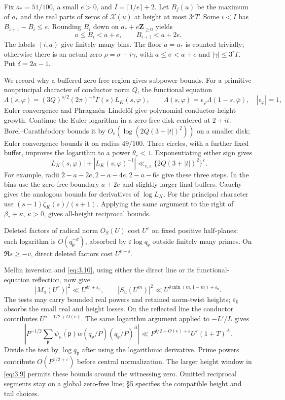 \documentclass[11pt,a4paper]{article}
\begin{document}
Fix \(a_*=51/100\), a small \(e>0\), and \(I=\lceil1/e\rceil+2\). Let \(B_j(u)\) be the maximum of \(a_*\) and the real parts of zeros of \(\mathcal X(u)\) at height at most \(3^jT\). Some \(i<I\) has \(B_{i+1}-B_i\le e\). Rounding \(B_i\) down on \(a_*+e\mathbf Z_{\ge0}\) yields \[
 a\le B_i<a+e,\qquad B_{i+1}<a+2e.
\tag{3.9}\label{eq:3.9}
\] The labels \((i,a)\) give finitely many bins. The floor \(a=a_*\) is counted trivially; otherwise there is an actual zero \(\rho=\sigma+i\gamma\), with \(a\le\sigma<a+e\) and \(|\gamma|\le3^iT\). Put \(\delta=2a-1\).

We record why a buffered zero-free region gives subpower bounds. For a primitive nonprincipal character of conductor norm \(Q\), the functional equation \[
 \Lambda(s,\varphi)=(3Q)^{s/2}(2\pi)^{-s}\Gamma(s)L_K(s,\varphi),\qquad
 \Lambda(s,\varphi)=\epsilon_\varphi\Lambda(1-s,\bar\varphi),\quad|\epsilon_\varphi|=1,
\] Euler convergence and Phragmén--Lindelöf give polynomial conductor-height growth. Continue the Euler logarithm in a zero-free disk centered at \(2+it\). Borel--Carathéodory bounds it by \(O_e(\log(2Q(3+|t|)^2))\) on a smaller disk; Euler convergence bounds it on radius \(49/100\). Three circles, with a further fixed buffer, improves the logarithm to a power \(\theta_e<1\). Exponentiating either sign gives \[
 |L_K(s,\varphi)|+|L_K(s,\varphi)^{-1}|
 \ll_{e,\varepsilon}\{2Q(3+|t|)^2\}^{\varepsilon}.
\tag{3.10}\label{eq:3.10}
\] For example, radii \(2-a-2e,2-a-4e,2-a-6e\) give these three steps. In the bins use the zero-free boundary \(a+2e\) and slightly larger final buffers. Cauchy gives the analogous bounds for derivatives of \(\log L_K\). For the principal character use \((s-1)\zeta_K(s)/(s+1)\). Applying the same argument to the right of \(\beta_*+\kappa\), \(\kappa>0\), gives all-height reciprocal bounds.

Deleted factors of radical norm \(O_S(U)\) cost \(U^\varepsilon\) on fixed positive half-planes: each logarithm is \(O(q_{\mathfrak p}^{-\sigma})\), absorbed by \(\varepsilon\log q_{\mathfrak p}\) outside finitely many primes. On \(\Re s\ge-v\), direct deleted factors cost \(U^{v+\varepsilon}\).

Mellin inversion and \eqref{eq:3.10}, using either the direct line or its functional-equation reflection, now give \[
 |M_u(U^r)|^2\ll U^{\delta r+\varepsilon_0},\qquad
 |S_u(U^m)|^2\ll U^{\delta\min(m,1-m)+\varepsilon_0}.
\tag{3.11}\label{eq:3.11}
\] The tests may carry bounded real powers and retained norm-twist heights; \(\varepsilon_0\) absorbs the small real and height losses. On the reflected line the conductor contributes \(U^{a-1/2+O(e)}\). The same logarithm argument applied to \(-L'/L\) gives \[
 \left|P^{-1/2}\sum_{\mathfrak p}\overline{\psi_u(\mathfrak p)}
 w(q_{\mathfrak p}/P)(q_{\mathfrak p}/P)^{it}\right|
 \ll P^{\delta/2+O(e)+\varepsilon}U^\varepsilon(1+T)^A.
\tag{3.12}\label{eq:3.12}
\] Divide the test by \(\log q_{\mathfrak p}\) after using the logarithmic derivative. Prime powers contribute \(O(P^{1/2+\varepsilon})\) before central normalization. The larger height window in \eqref{eq:3.9} permits these bounds around the witnessing zero. Omitted reciprocal segments stay on a global zero-free line; §5 specifies the compatible height and tail choices.
\end{document}
